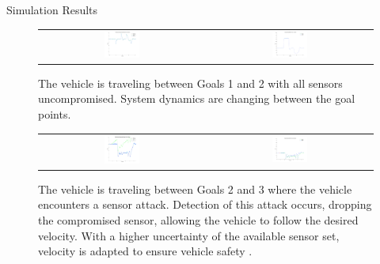 \begin{section}{Simulation Results}
\begin{figure}
\vspace{1pt}
\centering
\begin{tabular}{cc}
\includegraphics[width=0.22\textwidth]{vel_Goals1and2.png} & 
\includegraphics[width=0.22\textwidth]{Inputs_Goals1and2.png}
\end{tabular}
\label{fig:Goals1and2}
\caption{The vehicle is traveling between Goals 1 and 2 with all sensors uncompromised. System dynamics are changing between the goal points.}
\end{figure}



\begin{figure}
\vspace{1pt}
\centering
\begin{tabular}{cc}
\includegraphics[width=0.22\textwidth]{vel_Goals2and3.png} & 
\includegraphics[width=0.22\textwidth]{Inputs_Goals2and3.png}
\end{tabular}
\label{fig:Goals2and3}
\caption{The vehicle is traveling between Goals 2 and 3 where the vehicle encounters a sensor attack. Detection of this attack occurs, dropping the compromised sensor, allowing the vehicle to follow the desired velocity. With a higher uncertainty of the available sensor set, velocity is adapted to ensure vehicle safety . }
\end{figure}


\end{section}
